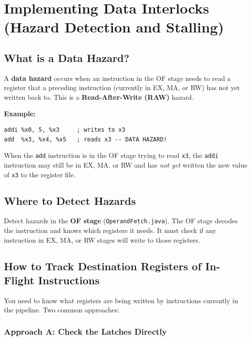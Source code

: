 \documentclass[12pt,a4paper]{article}
\begin{document}
\section{Implementing Data Interlocks (Hazard Detection and Stalling)}

\subsection{What is a Data Hazard?}

A \textbf{data hazard} occurs when an instruction in the OF stage needs to read a register that a preceding instruction (currently in EX, MA, or RW) has not yet written back to. This is a \textbf{Read-After-Write (RAW)} hazard.

\textbf{Example:}
\begin{lstlisting}[style=asmstyle]
addi %x0, 5, %x3     ; writes to x3
add  %x3, %x4, %x5   ; reads x3 -- DATA HAZARD!
\end{lstlisting}

When the \texttt{add} instruction is in the OF stage trying to read \texttt{x3}, the \texttt{addi} instruction may still be in EX, MA, or RW and has \textit{not yet} written the new value of \texttt{x3} to the register file.

\subsection{Where to Detect Hazards}

Detect hazards in the \textbf{OF stage} (\texttt{OperandFetch.java}). The OF stage decodes the instruction and knows which registers it needs. It must check if any instruction in EX, MA, or RW stages will write to those registers.

\subsection{How to Track Destination Registers of In-Flight Instructions}

You need to know what registers are being written by instructions currently in the pipeline. Two common approaches:

\subsubsection{Approach A: Check the Latches Directly}
\end{document}
